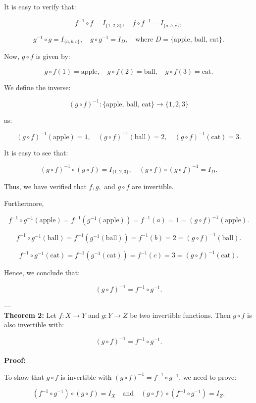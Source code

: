 \documentclass[12pt]{article}
\begin{document}
It is easy to verify that:

\[
f^{-1} \circ f = I_{\{1,2,3\}}, \quad f \circ f^{-1} = I_{\{a,b,c\}},
\]

\[
g^{-1} \circ g = I_{\{a,b,c\}}, \quad g \circ g^{-1} = I_D, \quad \text{where } D = \{\text{apple, ball, cat}\}.
\]

Now, \( g \circ f \) is given by:

\[
g \circ f (1) = \text{apple}, \quad g \circ f (2) = \text{ball}, \quad g \circ f (3) = \text{cat}.
\]

We define the inverse:

\[
(g \circ f)^{-1}: \{\text{apple, ball, cat}\} \to \{1, 2, 3\}
\]

as:

\[
(g \circ f)^{-1} (\text{apple}) = 1, \quad (g \circ f)^{-1} (\text{ball}) = 2, \quad (g \circ f)^{-1} (\text{cat}) = 3.
\]

It is easy to see that:

\[
(g \circ f)^{-1} \circ (g \circ f) = I_{\{1,2,3\}}, \quad (g \circ f) \circ (g \circ f)^{-1} = I_D.
\]

Thus, we have verified that \( f, g, \) and \( g \circ f \) are invertible. 

Furthermore, 

\[
f^{-1} \circ g^{-1} (\text{apple}) = f^{-1} (g^{-1} (\text{apple})) = f^{-1} (a) = 1 = (g \circ f)^{-1} (\text{apple}).
\]

\[
f^{-1} \circ g^{-1} (\text{ball}) = f^{-1} (g^{-1} (\text{ball})) = f^{-1} (b) = 2 = (g \circ f)^{-1} (\text{ball}).
\]

\[
f^{-1} \circ g^{-1} (\text{cat}) = f^{-1} (g^{-1} (\text{cat})) = f^{-1} (c) = 3 = (g \circ f)^{-1} (\text{cat}).
\]

Hence, we conclude that:

\[
(g \circ f)^{-1} = f^{-1} \circ g^{-1}.
\]

---
\\
\textbf{Theorem 2:}  
Let \( f: X \to Y \) and \( g: Y \to Z \) be two invertible functions. Then \( g \circ f \) is also invertible with:

\[
(g \circ f)^{-1} = f^{-1} \circ g^{-1}.
\]
\\
\textbf{Proof:}  

To show that \( g \circ f \) is invertible with \( (g \circ f)^{-1} = f^{-1} \circ g^{-1} \), we need to prove:

\[
(f^{-1} \circ g^{-1}) \circ (g \circ f) = I_X \quad \text{and} \quad (g \circ f) \circ (f^{-1} \circ g^{-1}) = I_Z.
\]
\end{document}
